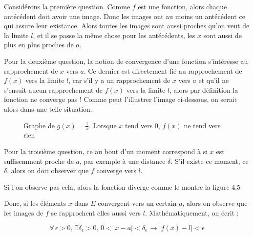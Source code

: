 Considérons la première question. Comme $f$ est une fonction, alors chaque antécédent doit avoir une image. Donc les images ont au moins un antécédent ce qui assure leur existance. Alors toutes les images sont aussi proches qu'on veut de la limite $l$, et il se passe la même chose pour les antécédents, les $x$ sont aussi de plus en plus proches de $a$.



Pour la deuxième question, la notion de convergence d'une fonction s'intéresse au rapprochement de $x$ vers $a$. Ce dernier est directement lié au rapprochement de $f(x)$ vers la limite $l$, car s'il  y a un rapprochement de $x$ vers $a$ et qu'il ne s'ensuit aucun rapprochement de $f(x)$ vers la limite $l$, alors par définition la fonction ne converge pas ! Comme peut l'illustrer l'image ci-dessous, on serait alors dans une telle situation.


\begin{figure}[H]
    \centering
    \caption{Graphe de $g(x) = \frac{1}{x}$. Lorsque $x$ tend vers $0$, $f(x)$ ne tend vers rien}
    \label{fig:graph_basic_functions}
\end{figure}


Pour la troisième question, ce \og au bout d'un moment \fg correspond à si $x$ est suffisemment proche de $a$, par exemple à une distance $\delta$. S'il existe ce moment, ce $\delta$, alors on doit observer que $f$ converge vers $l$.

Si l'on observe pas cela, alors la fonction diverge comme le montre la figure 4.5


Donc, si les éléments $x$ dans $E$ convergent vers un certain $a$, alors on observe que les images de $f$ se rapprochent elles aussi vers $l$. Mathématiquement, on écrit :


$$\forall \, \epsilon > 0, \, \exists \delta_{\epsilon} > 0, \, 0<\lvert x - a \rvert < \delta_{\epsilon} \, \rightarrow \lvert f(x) - l \rvert < \epsilon$$



